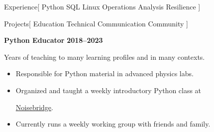 \documentclass[11pt,a4paper]{article}
\newenvironment{worksection}[3]{
    \begin{addmargin}[0.5em]{0em}
    {\large\bfseries #1} \hfill {\bfseries #2}\\%
    \hspace*{1em}#3
    \begin{itemize}
        [label=-, topsep=0pt, itemsep=0.5ex, parsep=0pt, leftmargin=1em]
}{
    \end{itemize}
    \end{addmargin}
    \medskip
}
\newcommand{\Noisebridge}{
  \href{https://www.noisebridge.net/}{Noisebridge}.
}
\begin{document}
\begin{mysection}{Experience}[
    Python
    \textbullet{} SQL
    \textbullet{} Linux
    \textbullet{} Operations
    \textbullet{} Analysis
    \textbullet{} Resilience
]


\end{mysection}

\begin{mysection}{Projects}[
    Education \textbullet{} Technical Communication \textbullet{} Community
]


  \begin{addmargin}[0.5em]{0em}
    {\large\bfseries Python Educator} \hfill {\bfseries 2018--2023}%
    \begin{adjustwidth}{1ex}{0ex}

    Years of teaching to many learning profiles and in many contexts.
    \begin{itemize}
        [label=-, topsep=0pt, itemsep=0.5ex, parsep=0pt, leftmargin=1em]

      \item Responsible for Python material in advanced physics labs.
      \item Organized and taught a weekly introductory Python class at
            \Noisebridge
      \item Currently runs a weekly working group with friends and family.

    \end{itemize}
    \end{adjustwidth}
  \end{addmargin}
  \medskip


\end{mysection}
\end{document}
